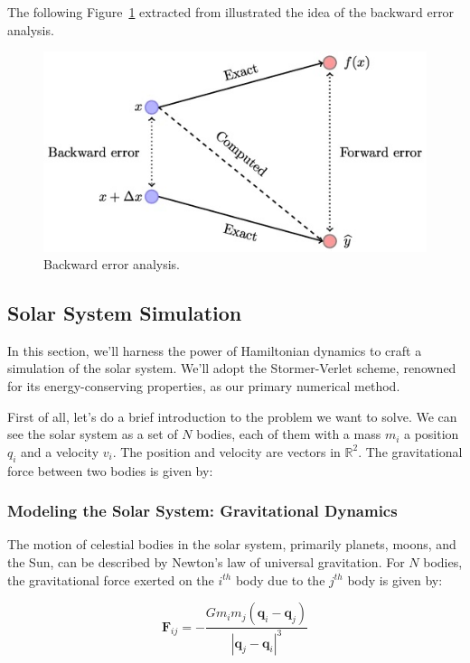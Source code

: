 \documentclass{article}
\begin{document}
The following Figure~\ref{fig:backwarderror} extracted from \cite{higham2020backwarderror} illustrated the idea of the backward error analysis.

\begin{figure}[H]
	\centering
	\includegraphics[width=0.5\linewidth]{./Figures/Sympletic/graphic.jpg}
	\caption{Backward error analysis.}
	\label{fig:backwarderror}
\end{figure}








\subsection{Solar System Simulation}
\label{sec:solar_system_simulation}

In this section, we'll harness the power of Hamiltonian dynamics to craft a simulation of the solar system. We'll adopt the Stormer-Verlet scheme, renowned for its energy-conserving properties, as our primary numerical method.

First of all, let's do a brief introduction to the problem we want to solve. We can see the solar system as a set of \(N\) bodies, each of them with a mass \(m_i\) a position \(q_i\) and a velocity \(v_i\). The position and velocity are vectors in \(\mathbb{R}^2\). The gravitational force between two bodies is given by:

\subsubsection{Modeling the Solar System: Gravitational Dynamics}
\label{sec:modeling_solar_system}

The motion of celestial bodies in the solar system, primarily planets, moons, and the Sun, can be described by Newton's law of universal gravitation. For \(N\) bodies, the gravitational force exerted on the \(i^{th}\) body due to the \(j^{th}\) body is given by:

\[
\mathbf{F}_{ij} = -\frac{G m_i m_j (\mathbf{q}_i - \mathbf{q}_j)}{|\mathbf{q}_j - \mathbf{q}_i|^3}
\]
\end{document}

